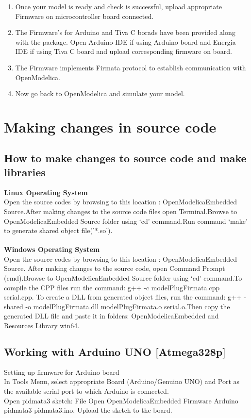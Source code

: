 \documentclass[12pt,a4paper]{report}
\begin{document}
\begin{enumerate}
\item Once your model is ready and check is successful, upload appropriate Firmware on microcontroller board connected.
\item The Firmware’s for Arduino and Tiva C borads have been provided along with the package. Open Arduino IDE if using Arduino board and Energia IDE if using Tiva C board and upload corresponding firmware on board.
\item The Firmware implements Firmata protocol to establish communication with OpenModelica.
\item Now go back to OpenModelica and simulate your model.
\end{enumerate}

\section{Making changes in source code}
\subsection{How to make changes to source code and make libraries}
{\textbf {Linux Operating System}}\\

Open the source codes by browsing to this location : OpenModelicaEmbedded \textrightarrow  Source.After making changes to the source code files open Terminal.Browse to OpenModelicaEmbedded \textrightarrow  Source folder using ‘cd’ command.Run command ‘make’ to generate shared object file('*.so').\\
\\
{\textbf {Windows Operating System}}\\

Open the source codes by browsing to this location : OpenModelicaEmbedded \textrightarrow  Source. After making changes to the source code, open Command Prompt (cmd).Browse to OpenModelicaEmbedded \textrightarrow  Source folder using ‘cd’ command.To compile the CPP files run the command: g++ -c modelPlugFirmata.cpp serial.cpp. To create a DLL from generated object files, run the command: g++ -shared -o modelPlugFirmata.dll modelPlugFirmata.o serial.o.Then copy the generated DLL file and paste it in folders: OpenModelicaEmbedded and Resources \textrightarrow  Library \textrightarrow  win64.\\

\subsection{Working with Arduino UNO [Atmega328p]}
 Setting up firmware for Arduino board\\
 In Tools Menu, select appropriate Board (Arduino/Genuino UNO) and Port as the available serial port to which Arduino is connected.\\
 Open pidmata3 sketch: File \textrightarrow  Open \textrightarrow  OpenModelicaEmbedded \textrightarrow  Firmware \textrightarrow  Arduino \textrightarrow  pidmata3 \textrightarrow  pidmata3.ino.
 Upload the sketch to the board.\\
 
\end{document}
